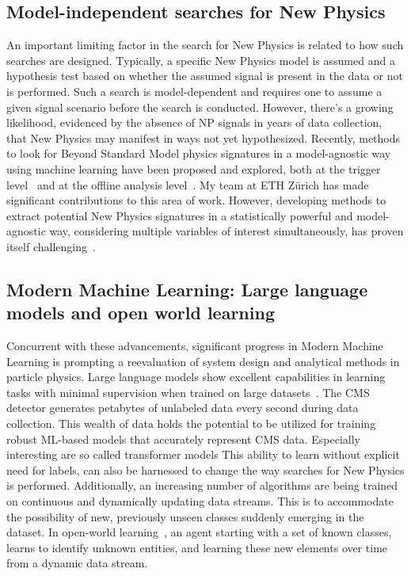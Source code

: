\documentclass[12pt]{iopart}
\begin{document}
\subsection{Model-independent searches for New Physics}
An important limiting factor in the search for New Physics is related to how such searches are designed. Typically, a specific New Physics model is assumed and a hypothesis test based on whether the assumed signal is present in the data or not is performed. Such a search is model-dependent and requires one to assume a given signal scenario before the search is conducted. However, there's a growing likelihood, evidenced by the absence of NP signals in years of data collection, that New Physics may manifest in ways not yet hypothesized. Recently, methods to look for Beyond Standard Model physics signatures in a model-agnostic way using machine learning have been proposed and explored, both at the trigger level~\cite{CMS-DP-2023-079,BELIS2024100091} and at the offline analysis level~\cite{Harris:2881089,BELIS2024100091}. My team at ETH Zürich has made significant contributions to this area of work. However, developing methods to extract potential New Physics signatures in a statistically powerful and model-agnostic way, considering multiple variables of interest simultaneously, has proven itself challenging~\cite{D_Agnolo_2019}.

\subsection{Modern Machine Learning: Large language models and open world learning}
Concurrent with these advancements, significant progress in Modern Machine Learning is prompting a reevaluation of system design and analytical methods in particle physics. Large language models show excellent capabilities in learning tasks with minimal supervision when trained on large datasets~\cite{Radford2019LanguageMA,brown2020language}. The CMS detector generates petabytes of unlabeled data every second during data collection. This wealth of data holds the potential to be utilized for training robust ML-based models that accurately represent CMS data. Especially interesting are so called transformer models
This ability to learn without explicit need for labels, can also be harnessed to change the way searches for New Physics is performed. 
Additionally, an increasing number of algorithms are being trained on continuous and dynamically updating data streams. This is to accommodate the possibility of new, previously unseen classes suddenly emerging in the dataset.
In open-world learning~\cite{jafarzadeh2022review}, an agent starting with a set of known classes, learns to identify unknown entities, and learning these new elements over time from a dynamic data stream.
\end{document}
